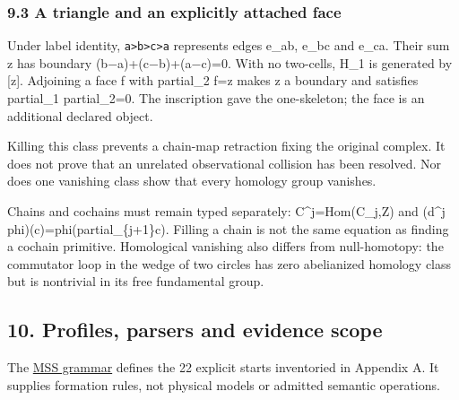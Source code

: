 \documentclass[
  11pt,
]{article}
\begin{document}
\subsubsection{9.3 A triangle and an explicitly attached
face}\label{a-triangle-and-an-explicitly-attached-face}

Under label identity,
\texttt{a\textgreater{}b\textgreater{}c\textgreater{}a} represents edges
e\_ab, e\_bc and e\_ca. Their sum z has boundary (b−a)+(c−b)+(a−c)=0.
With no two-cells, H\_1 is generated by {[}z{]}. Adjoining a face f with
partial\_2 f=z makes z a boundary and satisfies partial\_1 partial\_2=0.
The inscription gave the one-skeleton; the face is an additional
declared object.

Killing this class prevents a chain-map retraction fixing the original
complex. It does not prove that an unrelated observational collision has
been resolved. Nor does one vanishing class show that every homology
group vanishes.

Chains and cochains must remain typed separately: C\^{}j=Hom(C\_j,Z) and
(d\^{}j phi)(c)=phi(partial\_\{j+1\}c). Filling a chain is not the same
equation as finding a cochain primitive. Homological vanishing also
differs from null-homotopy: the commutator loop in the wedge of two
circles has zero abelianized homology class but is nontrivial in its
free fundamental group.

\subsection{10. Profiles, parsers and evidence
scope}\label{profiles-parsers-and-evidence-scope}

The
\href{../../../../../omega_engine_education/documentation/003_minimal_symbol_system_n_mssn/grammar/mssn.ebnf}{MSS
grammar} defines the 22 explicit starts inventoried in Appendix A. It
supplies formation rules, not physical models or admitted semantic
operations.
\end{document}
